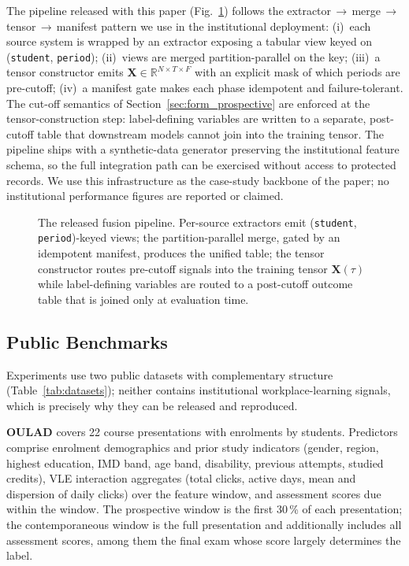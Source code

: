\documentclass[sn-mathphys,Numbered]{sn-jnl}
\begin{document}
The pipeline released with this paper (Fig.~\ref{fig:pipeline}) follows the extractor$\,\to\,$merge$\,\to\,$tensor$\,\to\,$manifest pattern we use in the institutional deployment: (i)~each source system is wrapped by an extractor exposing a tabular view keyed on (\texttt{student}, \texttt{period}); (ii)~views are merged partition-parallel on the key; (iii)~a tensor constructor emits $\mathbf{X} \in \mathbb{R}^{N \times T \times F}$ with an explicit mask of which periods are pre-cutoff; (iv)~a manifest gate makes each phase idempotent and failure-tolerant. The cut-off semantics of Section~\ref{sec:form_prospective} are enforced at the tensor-construction step: label-defining variables are written to a separate, post-cutoff table that downstream models cannot join into the training tensor. The pipeline ships with a synthetic-data generator preserving the institutional feature schema, so the full integration path can be exercised without access to protected records. We use this infrastructure as the case-study backbone of the paper; no institutional performance figures are reported or claimed.

\begin{figure}[ht]
  \centering
  \resizebox{0.88\textwidth}{!}{}
  \caption{The released fusion pipeline. Per-source extractors emit (\texttt{student}, \texttt{period})-keyed views; the partition-parallel merge, gated by an idempotent manifest, produces the unified table; the tensor constructor routes pre-cutoff signals into the training tensor $\mathbf{X}(\tau)$ while label-defining variables are routed to a post-cutoff outcome table that is joined only at evaluation time.}
  \label{fig:pipeline}
\end{figure}

\subsection{Public Benchmarks}\label{sec:benchmarks}

Experiments use two public datasets with complementary structure (Table~\ref{tab:datasets}); neither contains institutional workplace-learning signals, which is precisely why they can be released and reproduced.

\textbf{OULAD} \cite{Kuzilek2017} covers 22 course presentations with \nOULADenrol{} enrolments by \nOULADstudents{} students. Predictors comprise enrolment demographics and prior study indicators (gender, region, highest education, IMD band, age band, disability, previous attempts, studied credits), VLE interaction aggregates (total clicks, active days, mean and dispersion of daily clicks) over the feature window, and assessment scores due within the window. The prospective window is the first 30\,\% of each presentation; the contemporaneous window is the full presentation and additionally includes all assessment scores, among them the final exam whose score largely determines the label.
\end{document}
